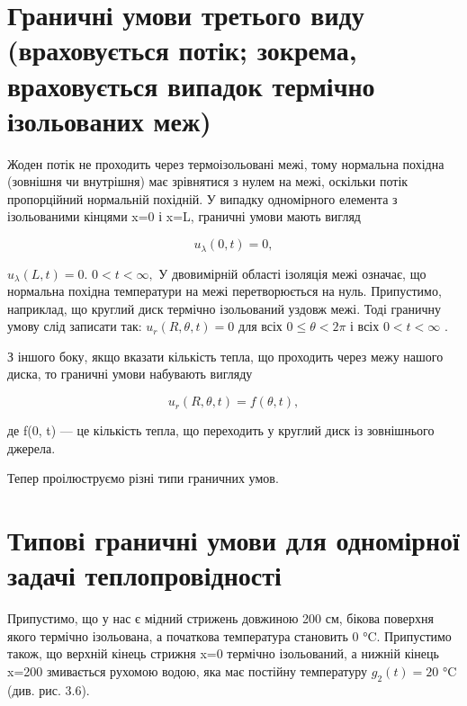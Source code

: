 \documentclass[
  ukrainian,
]{article}
\begin{document}
\section{Граничні умови третього виду (враховується потік; зокрема,
враховується випадок термічно ізольованих
меж)}\label{ux433ux440ux430ux43dux438ux447ux43dux456-ux443ux43cux43eux432ux438-ux442ux440ux435ux442ux44cux43eux433ux43e-ux432ux438ux434ux443-ux432ux440ux430ux445ux43eux432ux443ux454ux442ux44cux441ux44f-ux43fux43eux442ux456ux43a-ux437ux43eux43aux440ux435ux43cux430-ux432ux440ux430ux445ux43eux432ux443ux454ux442ux44cux441ux44f-ux432ux438ux43fux430ux434ux43eux43a-ux442ux435ux440ux43cux456ux447ux43dux43e-ux456ux437ux43eux43bux44cux43eux432ux430ux43dux438ux445-ux43cux435ux436}

Жоден потік не проходить через термоізольовані межі, тому нормальна
похідна (зовнішня чи внутрішня) має зрівнятися з нулем на межі, оскільки
потік пропорційний нормальній похідній. У випадку одномірного елемента з
ізольованими кінцями x=0 і x=L, граничні умови мають вигляд

\[
u_{\lambda}(0, t) = 0,
\]

\(u_{\lambda}(L, t) = 0.\) \(0 < t < \infty,\) У двовимірній області
ізоляція межі означає, що нормальна похідна температури на межі
перетворюється на нуль. Припустимо, наприклад, що круглий диск термічно
ізольований уздовж межі. Тоді граничну умову слід записати так:
\(u_r(R, \theta, t) = 0\) для всіх \(0 \le \theta < 2\pi\) і всіх
\(0 < t < \infty\) .

З іншого боку, якщо вказати кількість тепла, що проходить через межу
нашого диска, то граничні умови набувають вигляду

\[
u_r(R, \theta, t) = f(\theta, t),
\]

де f(0, t) --- це кількість тепла, що переходить у круглий диск із
зовнішнього джерела.

Тепер проілюструємо різні типи граничних умов.

\section{Типові граничні умови для одномірної задачі
теплопровідності}\label{ux442ux438ux43fux43eux432ux456-ux433ux440ux430ux43dux438ux447ux43dux456-ux443ux43cux43eux432ux438-ux434ux43bux44f-ux43eux434ux43dux43eux43cux456ux440ux43dux43eux457-ux437ux430ux434ux430ux447ux456-ux442ux435ux43fux43bux43eux43fux440ux43eux432ux456ux434ux43dux43eux441ux442ux456}

Припустимо, що у нас є мідний стрижень довжиною 200 см, бікова поверхня
якого термічно ізольована, а початкова температура становить 0 °C.
Припустимо також, що верхній кінець стрижня x=0 термічно ізольований, а
нижній кінець x=200 змивається рухомою водою, яка має постійну
температуру \(g_2(t)=20\) °C (див. рис. 3.6).
\end{document}
